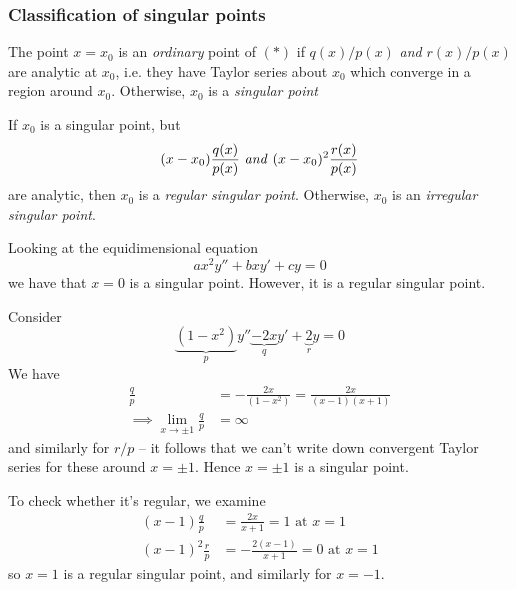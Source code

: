 \documentclass{../../template/note}
\begin{document}

    \subsubsection{Classification of singular points}
    
    \begin{definition}
        The point \(x=x_0\) is an \emph{ordinary} point of \((*)\) if \(q(x)/p(x)\) \emph{and} \(r(x)/p(x)\) are analytic at \(x_0\), i.e. they have Taylor series about \(x_0\) which converge in a region around \(x_0\). Otherwise, \(x_0\) is a \emph{singular point}
    \end{definition}
    
    \begin{definition}
        If \(x_0\) is a singular point, but
        \[
            (x-x_0)\frac{q(x)}{p(x)} \text{ \emph{and} } (x-x_0)^2\frac{r(x)}{p(x)}
        \]
        are analytic, then \(x_0\) is a \emph{regular singular point}. Otherwise, \(x_0\) is an \emph{irregular singular point}.
    \end{definition}
    
    \begin{example}
        Looking at the equidimensional equation
        \[
            ax^2y'' + bxy' + cy = 0
        \]
        we have that \(x=0\) is a singular point. However, it is a regular singular point.
    \end{example}
    
    \begin{example}
        Consider
        \[
            \underbrace{(1-x^2)}_{p}y'' \underbrace{- 2x}_{q}y' + \underbrace{2}_{r}y = 0
        \]
        We have
        \begin{align*}
            \frac{q}{p} &= -\frac{2x}{(1-x^2)} = \frac{2x}{(x-1)(x+1)} \\
            \implies \lim_{x \to \pm 1} \frac{q}{p} &= \infty
        \end{align*}
        and similarly for \(r/p\) -- it follows that we can't write down convergent Taylor series for these around \(x = \pm 1\). Hence \(x = \pm 1\) is a singular point.

        To check whether it's regular, we examine
        \begin{align*}
            (x-1)\frac{q}{p} &= \frac{2x}{x+1} = 1 \text{ at } x = 1 \\
            (x-1)^2\frac{r}{p} &= -\frac{2(x-1)}{x+1} = 0 \text{ at } x = 1
        \end{align*}
        so \(x = 1\) is a regular singular point, and similarly for \(x=-1\).
    \end{example}
    
\end{document}
